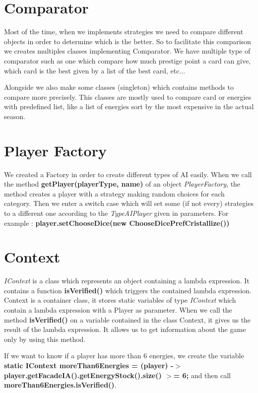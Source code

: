     \newpage
    \section{Comparator}
        Most of the time, when we implements strategies we need to compare different objects in order to determine which is the better. So to facilitate this comparison we creates multiples classes implementing Comparator.
        We have multiple type of comparator such as one which compare how much prestige point a card can give, which card is the best given by a list of the best card, etc...
        
        Alongside we also make some classes (singleton) which contains methods to compare more precisely. This classes are mostly used to compare card or energies with predefined list, like a list of energies sort by the most expensive in the actual season.
        
    
    
    \section{Player Factory}
        We created a Factory in order to create different types of AI easily. When we call the method \textbf{getPlayer(playerType, name)} of an object \textit{PlayerFactory}, the method creates a player with a strategy making random choices for each category. Then we enter a switch case which will set some (if not every) strategies to a different one according to the \textit{TypeAIPlayer} given in parameters.
        For example : \textbf{player.setChooseDice(new ChooseDicePrefCristallize())}
    
    
    \section{Context}

        \textit{IContext} is a class which represents an object containing a lambda expression. It contains a function \textbf{isVerified()} which triggers the contained lambda expression.
        Context is a container class, it stores static variables of type \textit{IContext} which contain a lambda expression with a Player as parameter.
        When we call the method \textbf{isVerified()} on a variable contained in the class Context, it gives us the result of the lambda expression.
        It allows us to get information about the game only by using this method.
        
        If we want to know if a player has more than 6 energies, we create the variable \textbf{static IContext moreThan6Energies = (player) -$>$ player.getFacadeIA().getEnergyStock().size() $>$= 6;} and then call \textbf{moreThan6Energies.isVerified()}.
        
